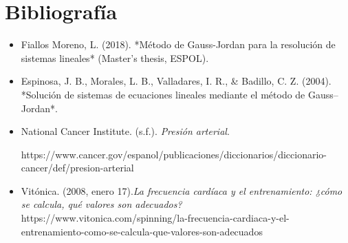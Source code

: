 \documentclass[a4paper,10pt]{article}
\begin{document}
\section{Bibliografía}
\begin{itemize}
    \item Fiallos Moreno, L. (2018). *Método de Gauss-Jordan para la resolución de sistemas lineales* (Master's thesis, ESPOL).
    \item Espinosa, J. B., Morales, L. B., Valladares, I. R., \& Badillo, C. Z. (2004). *Solución de sistemas de ecuaciones lineales mediante el método de Gauss–Jordan*.
     \item National Cancer Institute. (s.f.). \textit{Presión arterial}.
     
    https://www.cancer.gov/espanol/publicaciones/diccionarios/diccionario-cancer/def/presion-arterial
    \item Vitónica. (2008, enero 17).\textit{La frecuencia cardíaca y el entrenamiento: ¿cómo se calcula, qué valores son adecuados? }https://www.vitonica.com/spinning/la-frecuencia-cardiaca-y-el-entrenamiento-como-se-calcula-que-valores-son-adecuados
\end{itemize}
\end{document}
